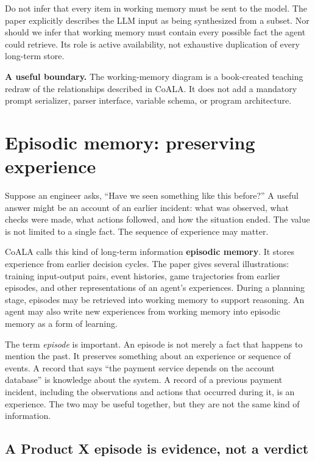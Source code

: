 Do not infer that every item in working memory must be sent to the model. The paper explicitly describes the LLM input as being synthesized from a subset. Nor should we infer that working memory must contain every possible fact the agent could retrieve. Its role is active availability, not exhaustive duplication of every long-term store.

\begin{notebox}
\textbf{A useful boundary.} The working-memory diagram is a book-created teaching redraw of the relationships described in CoALA. It does not add a mandatory prompt serializer, parser interface, variable schema, or program architecture.
\end{notebox}

\section{Episodic memory: preserving experience}
\label{sec:episodic-memory}

Suppose an engineer asks, ``Have we seen something like this before?'' A useful answer might be an account of an earlier incident: what was observed, what checks were made, what actions followed, and how the situation ended. The value is not limited to a single fact. The sequence of experience may matter.

CoALA calls this kind of long-term information \textbf{episodic memory}. It stores experience from earlier decision cycles. The paper gives several illustrations: training input-output pairs, event histories, game trajectories from earlier episodes, and other representations of an agent's experiences. During a planning stage, episodes may be retrieved into working memory to support reasoning. An agent may also write new experiences from working memory into episodic memory as a form of learning.

The term \emph{episode} is important. An episode is not merely a fact that happens to mention the past. It preserves something about an experience or sequence of events. A record that says ``the payment service depends on the account database'' is knowledge about the system. A record of a previous payment incident, including the observations and actions that occurred during it, is an experience. The two may be useful together, but they are not the same kind of information.

\subsection{A Product X episode is evidence, not a verdict}

